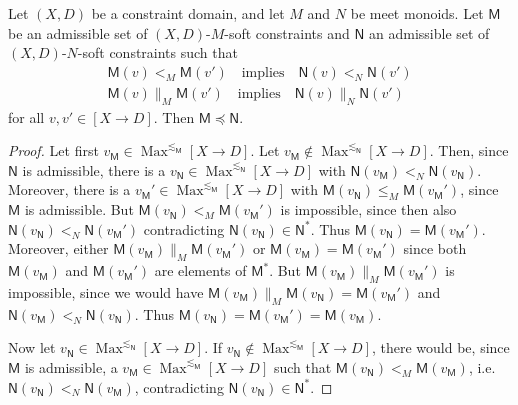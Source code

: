\documentclass[english]{notes}
\DeclareMathOperator{\Maxop}{\mathrm{Max}}
\newcommand{\Max}[1]{\Maxop^{#1}}
\begin{document}
\begin{lemma}\label{lem:simulation}
Let $(X, D)$ be a constraint domain, and let $M$ and $N$ be meet
monoids.  Let $\mathsf{M}$ be an admissible set of $(X, D)$-$M$-soft
constraints and $\mathsf{N}$ an admissible set of $(X, D)$-$N$-soft
constraints such that
%
\begin{gather*}
  \mathsf{M}(v) <_M \mathsf{M}(v')
\quad\text{implies}\quad
  \mathsf{N}(v) <_N \mathsf{N}(v')
\\
  \mathsf{M}(v) \parallel_M \mathsf{M}(v')
\quad\text{implies}\quad
  \mathsf{N}(v) \parallel_N \mathsf{N}(v')
\end{gather*}
%
for all $v, v' \in [X \to D]$.  Then $\mathsf{M} \preccurlyeq \mathsf{N}$.
\end{lemma}
\begin{proof}
Let first $v_{\mathsf{M}} \in \Max{\lesssim_{\mathsf{M}}} [X \to D]$.
Let $v_{\mathsf{M}} \notin \Max{\lesssim_{\mathsf{N}}} [X \to D]$.
Then, since $\mathsf{N}$ is admissible, there is a $v_{\mathsf{N}} \in
\Max{\lesssim_{\mathsf{N}}} [X \to D]$ with
$\mathsf{N}(v_{\mathsf{M}}) <_N \mathsf{N}(v_{\mathsf{N}})$.
Moreover, there is a $v_{\mathsf{M}}' \in \Max{\lesssim_{\mathsf{M}}}
[X \to D]$ with $\mathsf{M}(v_{\mathsf{N}}) \leq_M
\mathsf{M}(v_{\mathsf{M}}')$, since $\mathsf{M}$ is admissible.  But
$\mathsf{M}(v_{\mathsf{N}}) <_M \mathsf{M}(v_{\mathsf{M}}')$ is
impossible, since then also $\mathsf{N}(v_{\mathsf{N}}) <_N
\mathsf{N}(v_{\mathsf{M}}')$ contradicting $\mathsf{N}(v_{\mathsf{N}})
\in \mathsf{N}^*$.  Thus $\mathsf{M}(v_{\mathsf{N}}) =
\mathsf{M}(v_{\mathsf{M}}')$.  Moreover, either
$\mathsf{M}(v_{\mathsf{M}}) \parallel_M \mathsf{M}(v_{\mathsf{M}}')$
or $\mathsf{M}(v_{\mathsf{M}}) = \mathsf{M}(v_{\mathsf{M}}')$ since
both $\mathsf{M}(v_{\mathsf{M}})$ and $\mathsf{M}(v_{\mathsf{M}}')$
are elements of $\mathsf{M}^*$.  But
$\mathsf{M}(v_{\mathsf{M}}) \parallel_M \mathsf{M}(v_{\mathsf{M}}')$
is impossible, since we would have
$\mathsf{M}(v_{\mathsf{M}}) \parallel_M \mathsf{M}(v_{\mathsf{N}}) =
\mathsf{M}(v_{\mathsf{M}}')$ and $\mathsf{N}(v_{\mathsf{M}}) <_N
\mathsf{N}(v_{\mathsf{N}})$.  Thus $\mathsf{M}(v_{\mathsf{N}}) =
\mathsf{M}(v_{\mathsf{M}}') = \mathsf{M}(v_{\mathsf{M}})$.

Now let $v_{\mathsf{N}} \in \Max{\lesssim_{\mathsf{N}}} [X \to D]$. If
$v_{\mathsf{N}} \notin \Max{\lesssim_{\mathsf{M}}} [X \to D]$, there
would be, since $\mathsf{M}$ is admissible, a $v_{\mathsf{M}} \in
\Max{\lesssim_{\mathsf{M}}} [X \to D]$ such that
$\mathsf{M}(v_{\mathsf{N}}) <_M \mathsf{M}(v_{\mathsf{M}})$, i.e.\
$\mathsf{N}(v_{\mathsf{N}}) <_N \mathsf{N}(v_{\mathsf{M}})$,
contradicting $\mathsf{N}(v_{\mathsf{N}}) \in \mathsf{N}^*$.
\end{proof}
\end{document}
